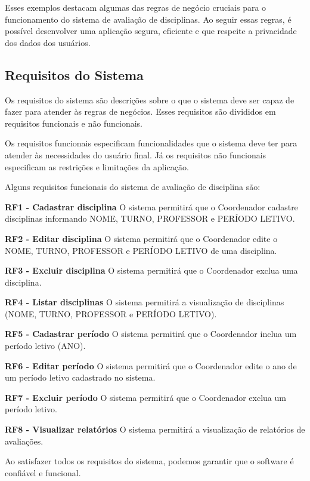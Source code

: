 Esses exemplos destacam algumas das regras de negócio cruciais para o funcionamento do sistema de avaliação de disciplinas. Ao seguir essas regras, é possível desenvolver uma aplicação segura, eficiente e que respeite a privacidade dos dados dos usuários.

\subsection{Requisitos do Sistema}
Os requisitos do sistema são descrições sobre o que o sistema deve ser capaz de fazer para atender às regras de negócios. Esses requisitos são divididos em requisitos funcionais e não funcionais. 

Os requisitos funcionais especificam funcionalidades que o sistema deve ter para atender às necessidades do usuário final. Já os requisitos não funcionais especificam as restrições e limitações da aplicação.

Alguns requisitos funcionais do sistema de avaliação de disciplina são:

\begin{alineas}
    \item \textbf{RF1 - Cadastrar disciplina} O sistema permitirá que o Coordenador cadastre disciplinas informando NOME, TURNO, PROFESSOR e PERÍODO LETIVO.
    \item \textbf{RF2 - Editar disciplina} O sistema permitirá que o Coordenador edite o NOME, TURNO, PROFESSOR e PERÍODO LETIVO de uma disciplina.
    \item \textbf{RF3 - Excluir disciplina} O sistema permitirá que o Coordenador exclua uma disciplina.
    \item \textbf{RF4 - Listar disciplinas} O sistema permitirá a visualização de disciplinas (NOME, TURNO, PROFESSOR e PERÍODO LETIVO).
    \item \textbf{RF5 - Cadastrar período} O sistema permitirá que o Coordenador inclua um período letivo (ANO).
    \item \textbf{RF6 - Editar período} O sistema permitirá que o Coordenador edite o ano de um período letivo cadastrado no sistema.
    \item \textbf{RF7 - Excluir período} O sistema permitirá que o Coordenador exclua um período letivo.
    \item \textbf{RF8 - Visualizar relatórios} O sistema permitirá a visualização de relatórios de avaliações.
\end{alineas}

Ao satisfazer todos os requisitos do sistema, podemos garantir que o software é confiável e funcional. 

